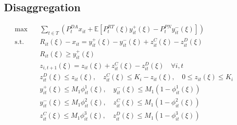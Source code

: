 \documentclass[10pt]{article}
\begin{document}
\subsection{Disaggregation}
\begin{subequations}
    \begin{align}
    \text{max} \quad &\sum_{t\in T}\left(P_t^{DA}x_{it} + \mathbb{E}\left[P_t^{RT}(\xi)y_{it}^{+}(\xi) - P_t^{PN}y_{it}^{-}(\xi)\right]\right)&\\    
    \text{s.t.} \quad &R_{it}(\xi) - x_{it} = y_{it}^{+}(\xi) - y_{it}^{-}(\xi) + z^C_{it}(\xi) - z^D_{it}(\xi) &\\ 
    &R_{it}(\xi) \geq y^+_{it}(\xi) &\\
    &z_{i,t+1}(\xi) = z_{it}(\xi) + z^C_{it}(\xi) - z^D_{it}(\xi) \quad \forall i, t &\\
    &z^D_{it}(\xi) \le z_{it}(\xi), \quad z^C_{it}(\xi) \le K_i-z_{it}(\xi), \quad 0 \leq z_{it}(\xi) \leq K_i &\\
    &y^+_{it}(\xi) \leq M_1 \phi^1_{it}(\xi), \quad y^-_{it}(\xi) \leq M_1 (1 - \phi^1_{it}(\xi)) &\\
        &y^-_{it}(\xi) \leq M_1 \phi^2_{it}(\xi), \quad z^C_{it}(\xi) \leq M_1 (1 - \phi^2_{it}(\xi)) &\\
        &z^C_{it}(\xi) \leq M_1 \phi^3_{it}(\xi), \quad z^D_{it}(\xi) \leq M_1 (1 - \phi^3_{it}(\xi)) &
    \end{align}
\end{subequations}
\end{document}

